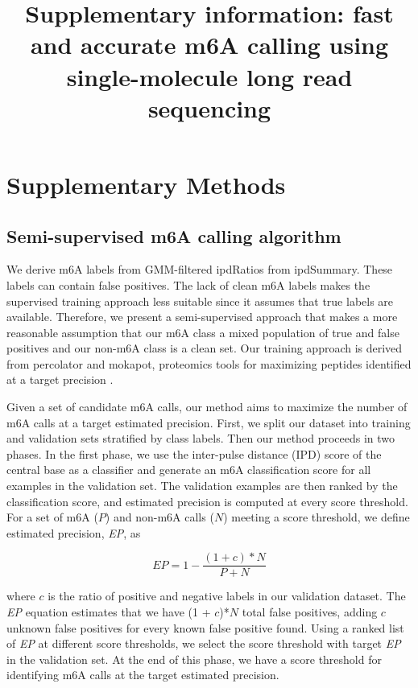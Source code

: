 \documentclass{article}
\date{}
\title{Supplementary information: fast and accurate m6A calling using single-molecule long read sequencing}
\begin{document}
\maketitle

\section{Supplementary Methods}
\subsection{Semi-supervised m6A calling algorithm}
We derive m6A labels from GMM-filtered ipdRatios from ipdSummary. These labels can contain false positives. The lack of clean m6A labels makes the supervised training approach less suitable since it assumes that true labels are available. Therefore, we present a semi-supervised approach that makes a more reasonable assumption that our m6A class a mixed population of true and false positives and our non-m6A class is a clean set. Our training approach is derived from percolator and mokapot, proteomics tools for maximizing peptides identified at a target precision \cite{fondrie2021mokapot,kall2007semi}.  

Given a set of candidate m6A calls, our method aims to maximize the number of m6A calls at a target estimated precision. First, we split our dataset into training and validation sets stratified by class labels. Then our method proceeds in two phases. In the first phase, we use the inter-pulse distance (IPD) score of the central base as a classifier and generate an m6A classification score for all examples in the validation set. The validation examples are then ranked by the classification score, and estimated precision is computed at every score threshold.  For a set of m6A ($P$) and non-m6A calls ($N$) meeting a score threshold, we define estimated precision, \textit{EP}, as 

\begin{equation}
EP = 1-\frac{(1 + c) * N}{P + N} 
\end{equation}

where $c$ is the ratio of positive and negative labels in our validation dataset. The \textit{EP} equation estimates that we have (1 + $c$)*$N$ total false positives, adding $c$ unknown false positives for every known false positive found. Using a ranked list of \textit{EP} at different score thresholds, we select the score threshold with target \textit{EP} in the validation set.  At the end of this phase, we have a score threshold for identifying m6A calls at the target estimated precision. 
\end{document}
